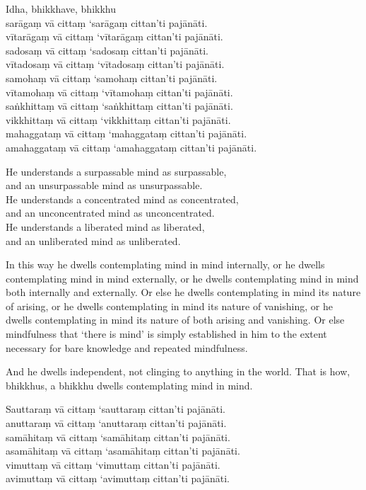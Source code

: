 Idha, bhikkhave, bhikkhu\\
sarāgaṃ vā cittaṃ ‘sarāgaṃ cittan’ti pajānāti.\\
vītarāgaṃ vā cittaṃ ‘vītarāgaṃ cittan’ti pajānāti.\\
sadosaṃ vā cittaṃ ‘sadosaṃ cittan’ti pajānāti.\\
vītadosaṃ vā cittaṃ ‘vītadosaṃ cittan’ti pajānāti.\\
samohaṃ vā cittaṃ ‘samohaṃ cittan’ti pajānāti.\\
vītamohaṃ vā cittaṃ ‘vītamohaṃ cittan’ti pajānāti.\\
saṅkhittaṃ vā cittaṃ ‘saṅkhittaṃ cittan’ti pajānāti.\\
vikkhittaṃ vā cittaṃ ‘vikkhittaṃ cittan’ti pajānāti.\\
mahaggataṃ vā cittaṃ ‘mahaggataṃ cittan’ti pajānāti.\\
amahaggataṃ vā cittaṃ ‘amahaggataṃ cittan’ti pajānāti.

\englishPage

He understands a surpassable mind as surpassable,\\
and an unsurpassable mind as unsurpassable.\\
He understands a concentrated mind as concentrated,\\
and an unconcentrated mind as unconcentrated.\\
He understands a liberated mind as liberated,\\
and an unliberated mind as unliberated.

In this way he dwells contemplating mind in mind internally, or he dwells
contemplating mind in mind externally, or he dwells contemplating mind in mind
both internally and externally. Or else he dwells contemplating in mind its
nature of arising, or he dwells contemplating in mind its nature of vanishing,
or he dwells contemplating in mind its nature of both arising and vanishing. Or
else mindfulness that ‘there is mind’ is simply established in him to the extent
necessary for bare knowledge and repeated mindfulness.

And he dwells independent, not clinging to anything in the world. That is how,
bhikkhus, a bhikkhu dwells contemplating mind in mind.


\paliPage

Sauttaraṃ vā cittaṃ ‘sauttaraṃ cittan’ti pajānāti.\\
anuttaraṃ vā cittaṃ ‘anuttaraṃ cittan’ti pajānāti.\\
samāhitaṃ vā cittaṃ ‘samāhitaṃ cittan’ti pajānāti.\\
asamāhitaṃ vā cittaṃ ‘asamāhitaṃ cittan’ti pajānāti.\\
vimuttaṃ vā cittaṃ ‘vimuttaṃ cittan’ti pajānāti.\\
avimuttaṃ vā cittaṃ ‘avimuttaṃ cittan’ti pajānāti.

